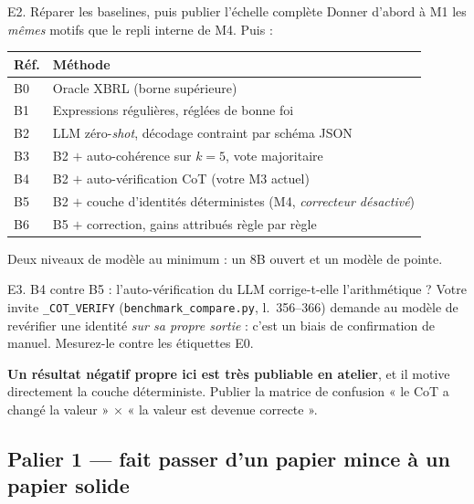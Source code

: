 \documentclass[11pt,a4paper]{article}
\newcommand{\fic}[1]{\texttt{\small #1}}
\begin{document}
\begin{exper}{E2. Réparer les baselines, puis publier l'échelle complète}
Donner d'abord à M1 les \emph{mêmes} motifs que le repli interne de M4. Puis :

\begin{center}
\begin{tabular}{@{}ll@{}}
\toprule
\textbf{Réf.} & \textbf{Méthode} \\
\midrule
B0 & Oracle XBRL (borne supérieure) \\
B1 & Expressions régulières, réglées de bonne foi \\
B2 & LLM zéro-\textit{shot}, décodage contraint par schéma JSON \\
B3 & B2 $+$ auto-cohérence sur $k=5$, vote majoritaire \\
B4 & B2 $+$ auto-vérification CoT (votre M3 actuel) \\
B5 & B2 $+$ couche d'identités déterministes (M4, \emph{correcteur désactivé}) \\
B6 & B5 $+$ correction, gains attribués règle par règle \\
\bottomrule
\end{tabular}
\end{center}

Deux niveaux de modèle au minimum : un 8B ouvert et un modèle de pointe.
\end{exper}

\begin{exper}{E3. B4 contre B5 : l'auto-vérification du LLM corrige-t-elle l'arithmétique ?}
Votre invite \fic{\_COT\_VERIFY} (\fic{benchmark\_compare.py}, l.~356--366)
demande au modèle de revérifier une identité \emph{sur sa propre sortie} : c'est
un biais de confirmation de manuel. Mesurez-le contre les étiquettes E0.

\textbf{Un résultat négatif propre ici est très publiable en atelier}, et il
motive directement la couche déterministe. Publier la matrice de confusion
« le CoT a changé la valeur » $\times$ « la valeur est devenue correcte ».
\end{exper}

\subsection{Palier 1 --- fait passer d'un papier mince à un papier solide}
\end{document}
